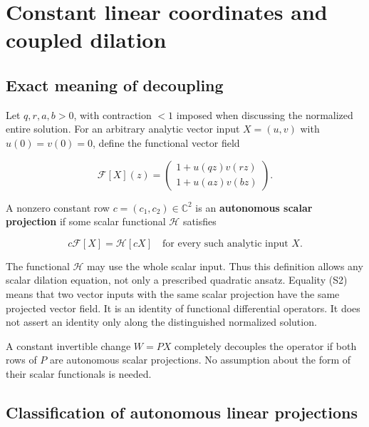 \hypertarget{v11-coupled_structure_full-constant-linear-coordinates-and-coupled-dilation}{%
\chapter[Constant linear coordinates]{Constant linear coordinates and coupled
dilation}\label{app:coupled-structure}\label{v11-coupled_structure_full-constant-linear-coordinates-and-coupled-dilation}}

\hypertarget{v11-coupled_structure_full-exact-meaning-of-decoupling}{%
\section{Exact meaning of
decoupling}\label{v11-coupled_structure_full-exact-meaning-of-decoupling}}

Let \(q,r,a,b>0\), with contraction \(<1\) imposed when discussing the
normalized entire solution. For an arbitrary analytic vector input
\(X=(u,v)\) with \(u(0)=v(0)=0\), define the functional vector field

\[
\mathcal F[X](z)=
\begin{pmatrix}1+u(qz)v(rz)\\1+u(az)v(bz)\end{pmatrix}.
\tag{S1}
\]

A nonzero constant row \(c=(c_1,c_2)\in\mathbb C^2\) is an
\textbf{autonomous scalar projection} if some scalar functional
\(\mathcal H\) satisfies

\[
c\mathcal F[X]=\mathcal H[cX]
\quad\text{for every such analytic input }X.
\tag{S2}
\]

The functional \(\mathcal H\) may use the whole scalar input. Thus this
definition allows any scalar dilation equation, not only a prescribed
quadratic ansatz. Equality (S2) means that two vector inputs with the
same scalar projection have the same projected vector field. It is an
identity of functional differential operators. It does not assert an
identity only along the distinguished normalized solution.

A constant invertible change \(W=PX\) completely decouples the operator
if both rows of \(P\) are autonomous scalar projections. No assumption
about the form of their scalar functionals is needed.

\hypertarget{v11-coupled_structure_full-classification-of-autonomous-linear-projections}{%
\section{Classification of autonomous linear
projections}\label{v11-coupled_structure_full-classification-of-autonomous-linear-projections}}

